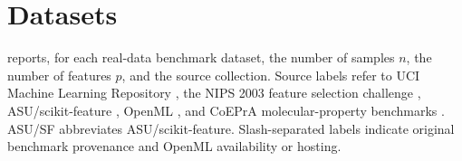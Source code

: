 \section{Datasets}
\label{app:dataset-inventory}

 reports, for each real-data benchmark
dataset, the number of samples $n$, the number of features $p$, and the source
collection. Source labels refer to UCI Machine Learning Repository
\citep{KellyLongjohnNottinghamUCI}, the NIPS 2003 feature selection challenge
\citep{Guyon2004NIPSFeatureSelectionChallenge}, ASU/scikit-feature
\citep{Li2018FeatureSelectionDataPerspective}, OpenML
\citep{Vanschoren2014OpenML}, and CoEPrA molecular-property benchmarks
\citep{DemirKavuk2010CoeprA}. ASU/SF abbreviates ASU/scikit-feature.
Slash-separated labels indicate original benchmark provenance and OpenML
availability or hosting.

